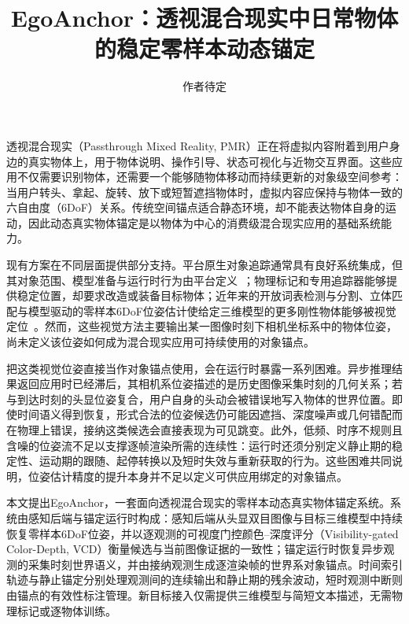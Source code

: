 \documentclass[review]{vgtc}
\title{EgoAnchor：透视混合现实中日常物体的稳定零样本动态锚定}
\author{作者待定}
\begin{document}
\label{sec:introduction}
\maketitle

透视混合现实（Passthrough Mixed Reality, PMR）正在将虚拟内容附着到用户身边的真实物体上，用于物体说明、操作引导、状态可视化与近物交互界面。这些应用不仅需要识别物体，还需要一个能够随物体移动而持续更新的对象级空间参考：当用户转头、拿起、旋转、放下或短暂遮挡物体时，虚拟内容应保持与物体一致的六自由度（6DoF）关系。传统空间锚点适合静态环境，却不能表达物体自身的运动，因此动态真实物体锚定是以物体为中心的消费级混合现实应用的基础系统能力。

现有方案在不同层面提供部分支持。平台原生对象追踪通常具有良好系统集成，但其对象范围、模型准备与运行时行为由平台定义~\cite{appleObjectAnchor,appleObjectTracking2026,azureObjectAnchors,metaDynamicObjectTracker}；物理标记和专用追踪器能够提供稳定位置，却要求改造或装备目标物体；近年来的开放词表检测与分割、立体匹配与模型驱动的零样本6DoF位姿估计使给定三维模型的更多刚性物体能够被视觉定位~\cite{foundationpose2023,megapose2022}。然而，这些视觉方法主要输出某一图像时刻下相机坐标系中的物体位姿，尚未定义该位姿如何成为混合现实应用可持续使用的对象锚点。

把这类视觉位姿直接当作对象锚点使用，会在运行时暴露一系列困难。异步推理结果返回应用时已经滞后，其相机系位姿描述的是历史图像采集时刻的几何关系；若与到达时刻的头显位姿复合，用户自身的头动会被错误地写入物体的世界位置。即使时间语义得到恢复，形式合法的位姿候选仍可能因遮挡、深度噪声或几何错配而在物理上错误，接纳这类候选会直接表现为可见跳变。此外，低频、时序不规则且含噪的位姿流不足以支撑逐帧渲染所需的连续性：运行时还须分别定义静止期的稳定性、运动期的跟随、起停转换以及短时失效与重新获取的行为。这些困难共同说明，位姿估计精度的提升本身并不足以定义可供应用绑定的对象锚点。

本文提出EgoAnchor，一套面向透视混合现实的零样本动态真实物体锚定系统。系统由感知后端与锚定运行时构成：感知后端从头显双目图像与目标三维模型中持续恢复零样本6DoF位姿，并以逐观测的可视度门控颜色--深度评分（Visibility-gated Color-Depth, VCD）衡量候选与当前图像证据的一致性；锚定运行时恢复异步观测的采集时刻世界语义，并由接纳观测生成逐渲染帧的世界系对象锚点。时间索引轨迹与静止锚定分别处理观测间的连续输出和静止期的残余波动，短时观测中断则由锚点的有效性标注管理。新目标接入仅需提供三维模型与简短文本描述，无需物理标记或逐物体训练。
\end{document}
